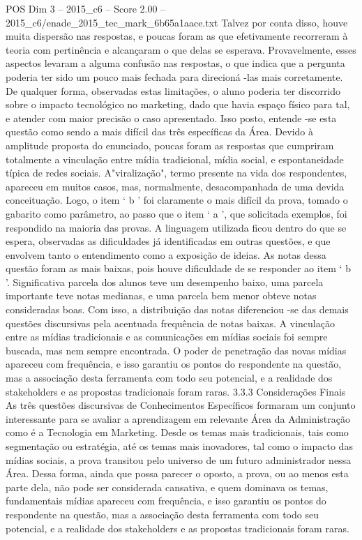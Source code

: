 \begin{textsample}{POS Dim 3 – 2015\_c6 – Score 2.00 – 2015\_c6/enade\_2015\_tec\_mark\_6b65a1aace.txt}
Talvez por conta disso, houve muita dispersão nas respostas, e poucas foram as que efetivamente recorreram à teoria com pertinência e alcançaram o que delas se esperava.
Provavelmente, esses aspectos levaram a alguma confusão nas respostas, o que indica que a pergunta poderia ter sido um pouco mais fechada para direcioná -las mais corretamente.
De qualquer forma, observadas estas limitações, o aluno poderia ter discorrido sobre o impacto tecnológico no marketing, dado que havia espaço físico para tal, e atender com maior precisão o caso apresentado.
Isso posto, entende -se esta questão como sendo a mais difícil das três específicas da Área.
Devido à amplitude proposta do enunciado, poucas foram as respostas que cumpriram totalmente a vinculação entre mídia tradicional, mídia social, e espontaneidade típica de redes sociais.
A"viralização", termo presente na vida dos respondentes, apareceu em muitos casos, mas, normalmente, desacompanhada de uma devida conceituação.
Logo, o item ‘ b ’ foi claramente o mais difícil da prova, tomado o gabarito como parâmetro, ao passo que o item ‘ a ’, que solicitada exemplos, foi respondido na maioria das provas.
A linguagem utilizada ficou dentro do que se espera, observadas as dificuldades já identificadas em outras questões, e que envolvem tanto o entendimento como a exposição de ideias.
As notas dessa questão foram as mais baixas, pois houve dificuldade de se responder ao item ‘ b ’.
Significativa parcela dos alunos teve um desempenho baixo, uma parcela importante teve notas medianas, e uma parcela bem menor obteve notas consideradas boas.
Com isso, a distribuição das notas diferenciou -se das demais questões discursivas pela acentuada frequência de notas baixas.
A vinculação entre as mídias tradicionais e as comunicações em mídias sociais foi sempre buscada, mas nem sempre encontrada.
O poder de penetração das novas mídias apareceu com frequência, e isso garantiu os pontos do respondente na questão, mas a associação desta ferramenta com todo seu potencial, e a realidade dos stakeholders e as propostas tradicionais foram raras. 3.3.3 Considerações Finais As três questões discursivas de Conhecimentos Específicos formaram um conjunto interessante para se avaliar a aprendizagem em relevante Área da Administração como é a Tecnologia em Marketing.
Desde os temas mais tradicionais, tais como segmentação ou estratégia, até os temas mais inovadores, tal como o impacto das mídias sociais, a prova transitou pelo universo de um futuro administrador nessa Área.
Dessa forma, ainda que possa parecer o oposto, a prova, ou ao menos esta parte dela, não pode ser considerada cansativa, e quem dominava os temas, fundamentais mídias apareceu com frequência, e isso garantiu os pontos do respondente na questão, mas a associação desta ferramenta com todo seu potencial, e a realidade dos stakeholders e as propostas tradicionais foram raras.

\end{textsample}
